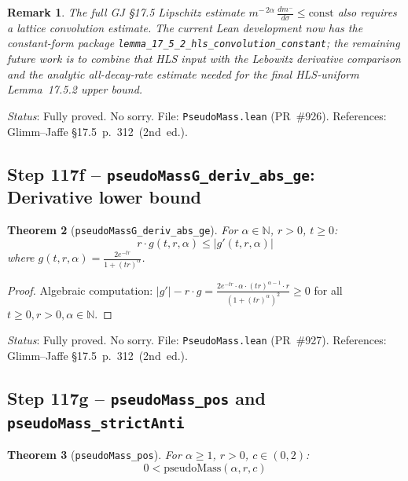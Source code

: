 \documentclass[a4paper,11pt]{article}
\newtheorem{theorem}{Theorem}
\newtheorem{remark}[theorem]{Remark}
\begin{document}
\begin{remark}
The full GJ §17.5 Lipschitz estimate
$m^{-\,2\alpha}\,\frac{dm^-}{d\sigma} \le \mathrm{const}$ also requires a
lattice convolution estimate.  The current Lean development now has the
constant-form package
\texttt{lemma\_17\_5\_2\_hls\_convolution\_constant}; the remaining future
work is to combine that HLS input with the Lebowitz derivative comparison and
the analytic all-decay-rate estimate needed for the final HLS-uniform
Lemma~17.5.2 upper bound.
\end{remark}

\noindent\textit{Status}: Fully proved. No sorry.
File: \texttt{PseudoMass.lean} (PR~\#926).
References: Glimm--Jaffe \S17.5~p.~312~(2nd~ed.).


\subsection*{Step 117f -- \texttt{pseudoMassG\_deriv\_abs\_ge}: Derivative lower bound}

\begin{theorem}[\texttt{pseudoMassG\_deriv\_abs\_ge}]
For $\alpha \in \mathbb{N}$, $r > 0$, $t \ge 0$:
\[
  r \cdot g(t,r,\alpha) \le |g'(t,r,\alpha)|
\]
where $g(t,r,\alpha) = \frac{2e^{-tr}}{1+(tr)^\alpha}$.
\end{theorem}

\begin{proof}
Algebraic computation: $|g'| - r \cdot g = \frac{2e^{-tr} \cdot \alpha \cdot (tr)^{\alpha-1} \cdot r}{(1+(tr)^\alpha)^2} \ge 0$
for all $t \ge 0, r > 0, \alpha \in \mathbb{N}$.
\end{proof}

\noindent\textit{Status}: Fully proved. No sorry.
File: \texttt{PseudoMass.lean} (PR~\#927).
References: Glimm--Jaffe \S17.5~p.~312~(2nd~ed.).

\subsection*{Step 117g -- \texttt{pseudoMass\_pos} and \texttt{pseudoMass\_strictAnti}}

\begin{theorem}[\texttt{pseudoMass\_pos}]
For $\alpha \ge 1$, $r > 0$, $c \in (0,2)$:
\[
  0 < \mathrm{pseudoMass}(\alpha, r, c)
\]
\end{theorem}
\end{document}
